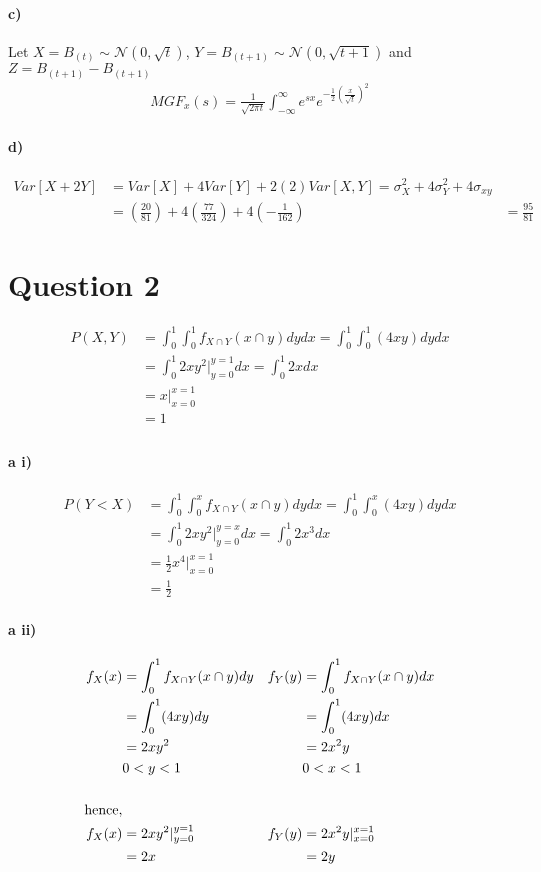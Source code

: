 \documentclass[letterpaper,12pt,titlepage,oneside,final]{book}
\newcommand{\GN}{\mathcal{N}}
\begin{document}
\paragraph{c)} 
Let $X = B_{(t)} \sim \GN(0, \sqrt{t})$, $Y = B_{(t+1)} \sim \GN(0, \sqrt{t+1})$ and 
$Z =  B_{(t+1)} - B_{(t+1)}$\\
\begin{align*}
MGF_x(s) =  \frac{1}{\sqrt{2\pi t}} \int_{-\infty}^{\infty}e^{sx} e^{-\frac{1}{2}\left(\frac{x}{\sqrt{t}}\right)^2}
\end{align*}


\paragraph{d)}
\begin{align*}
Var[X + 2Y] &= Var[X] + 4Var[Y] +2(2)Var[X,Y]= \sigma_X^2 +4\sigma_Y^2 +4\sigma_{xy}\\
& =  \left(\frac{20}{81}\right) +4\left(\frac{77}{324}\right) + 4\left(-\frac{1}{162}\right)
&= \frac{95}{81}
\end{align*}
\clearpage



\section*{Question 2}
\begin{align*}
P(X,Y) &= \int_0^1 \int_{0}^{1}f_{X \cap Y}(x\cap y)dydx = \int_0^1 \int_{0}^{1}(4xy)dydx\\
&= \int_0^1 2xy^2\rvert_{y=0}^{y=1}dx = \int_0^1 2xdx\\
&= x\rvert_{x=0}^{x=1}\\ &=1\\
\end{align*}
\paragraph{a i)}
\begin{align*}
P(Y<X) &= \int_0^1 \int_{0}^{x}f_{X \cap Y}(x\cap y)dydx = \int_0^1 \int_{0}^{x}(4xy) dydx\\
&= \int_0^1 2xy^2\rvert_{y=0}^{y=x}dx = \int_0^1 2x^3dx\\
&= \frac{1}{2}x^4\rvert_{x=0}^{x=1}\\
&= \frac{1}{2}
\end{align*}
\paragraph{a ii)}
\begin{align*}
f_X(x)&=\int_{0}^{1}f_{X \cap Y}(x\cap y)dy &f_Y(y)&=\int_{0}^{1}f_{X \cap Y}(x\cap y)dx\\
&=\int_{0}^{1}(4xy)dy &&=\int_{0}^{1}(4xy)dx\\
&= 2xy^2 &&= 2x^2y\\
& 0<y<1 && 0<x<1\\
\bigskip\\
\text{hence},\\
f_X(x)&= 2xy^2 \rvert_{y=0}^{y=1} &f_Y(y)&= 2x^2y\rvert_{x=0}^{x=1}\\
&=2x &&=2y
\end{align*}
\end{document}
